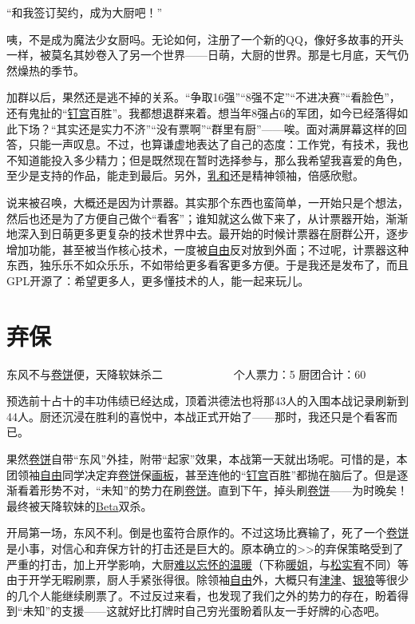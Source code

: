  “和我签订契约，成为大厨吧！”

咦，不是成为魔法少女厨吗。无论如何，注册了一个新的QQ，像好多故事的开头一样，被莫名其妙卷入了另一个世界——日萌，大厨的世界。那是七月底，天气仍然燥热的季节。

加群以后，果然还是逃不掉的关系。“争取16强”“8强不定”“不进决赛”“看脸色”，还有鬼扯的“\uline{钉宫}百胜”。我都想退群来着。想当年8强占6的军团，如今已经落得如此下场？“其实还是实力不济”“没有票啊”“群里有厨”——唉。面对满屏幕这样的回答，只能一声叹息。不过，也算谦虚地表达了自己的态度：工作党，有技术，我也不知道能投入多少精力；但是既然现在暂时选择参与，那么我希望我喜爱的角色，至少是支持的作品，能走到最后。另外，\uline{乳和}还是精神领袖，倍感欣慰。

说来被召唤，大概还是因为计票器。其实那个东西也蛮简单，一开始只是个想法，然后也还是为了方便自己做个“看客”；谁知就这么做下来了，从计票器开始，渐渐地深入到日萌更多更复杂的技术世界中去。最开始的时候计票器在厨群公开，逐步增加功能，甚至被当作核心技术，一度被\uline{自由}反对放到外面；不过呢，计票器这种东西，独乐乐不如众乐乐，不如带给更多看客更多方便。于是我还是发布了，而且GPL开源了：希望更多人，更多懂技术的人，能一起来玩儿。

\chapter{弃保}
\begin{center}
{\subTitle 东风不与\uline{卷饼}便，天降软妹杀二}
\subMemo
　　　　　　个人票力：5 厨团合计：60
\end{center}

预选前十占十的丰功伟绩已经达成，顶着洪德法也将那43人的入围本战记录刷新到44人。厨还沉浸在胜利的喜悦中，本战正式开始了——那时，我还只是个看客而已。

果然\uline{卷饼}自带“东风”外挂，附带“起家”效果，本战第一天就出场呢。可惜的是，本团领袖\uline{自由}同学决定弃\uline{卷饼}保\uline{画板}，甚至连他的“\uline{钉宫}百胜”都抛在脑后了。但是逐渐看着形势不对，“未知”的势力在刷\uline{卷饼}。直到下午，掉头刷\uline{卷饼}——为时晚矣！最终被天降软妹的\uline{Beta}双杀。

开局第一场，东风不利。倒是也蛮符合原作的。不过这场比赛输了，死了一个\uline{卷饼}是小事，对信心和弃保方针的打击还是巨大的。原本确立的>>的弃保策略受到了严重的打击，加上开学影响，大厨\uline{难以忘怀的温暖}（下称\uline{暖姐}，与\uline{松实宥}不同）等由于开学无暇刷票，厨人手紧张得很。除领袖\uline{自由}外，大概只有\uline{津津}、\uline{银狼}等很少的几个人能继续刷票了。不过反过来看，也发现了我们之外的势力的存在，盼着得到“未知”的支援——这就好比打牌时自己穷光蛋盼着队友一手好牌的心态吧。


